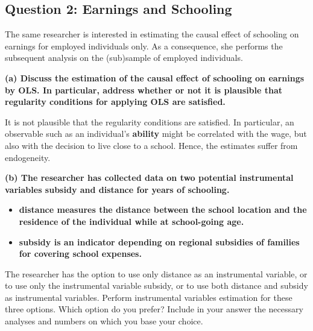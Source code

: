 \documentclass[
]{article}
\providecommand{\tightlist}{%
  \setlength{\itemsep}{0pt}\setlength{\parskip}{0pt}}
\begin{document}
\hypertarget{question-2-earnings-and-schooling}{%
\subsection{Question 2: Earnings and
Schooling}\label{question-2-earnings-and-schooling}}

The same researcher is interested in estimating the causal effect of
schooling on earnings for employed individuals only. As a consequence,
she performs the subsequent analysis on the (sub)sample of employed
individuals.

\textbf{(a) Discuss the estimation of the causal effect of schooling on
earnings by OLS. In particular, address whether or not it is plausible
that regularity conditions for applying OLS are satisfied.}

It is not plausible that the regularity conditions are satisfied. In
particular, an observable such as an individual's \textbf{ability} might
be correlated with the wage, but also with the decision to live close to
a school. Hence, the estimates suffer from endogeneity.

\textbf{(b) The researcher has collected data on two potential
instrumental variables subsidy and distance for years of schooling.}

\begin{itemize}
\tightlist
\item
  \textbf{distance measures the distance between the school location and
  the residence of the individual while at school-going age.}
\item
  \textbf{subsidy is an indicator depending on regional subsidies of
  families for covering school expenses.}
\end{itemize}

The researcher has the option to use only distance as an instrumental
variable, or to use only the instrumental variable subsidy, or to use
both distance and subsidy as instrumental variables. Perform
instrumental variables estimation for these three options. Which option
do you prefer? Include in your answer the necessary analyses and numbers
on which you base your choice.
\end{document}
